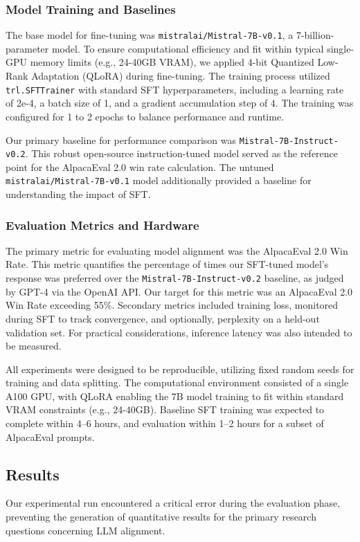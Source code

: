 \documentclass[11pt]{article}
\begin{document}
\subsubsection{Model Training and Baselines}
The base model for fine-tuning was \texttt{mistralai/Mistral-7B-v0.1}, a 7-billion-parameter model. To ensure computational efficiency and fit within typical single-GPU memory limits (e.g., 24-40GB VRAM), we applied 4-bit Quantized Low-Rank Adaptation (QLoRA) during fine-tuning. The training process utilized \texttt{trl.SFTTrainer} with standard SFT hyperparameters, including a learning rate of 2e-4, a batch size of 1, and a gradient accumulation step of 4. The training was configured for 1 to 2 epochs to balance performance and runtime.

Our primary baseline for performance comparison was \texttt{Mistral-7B-Instruct-v0.2}. This robust open-source instruction-tuned model served as the reference point for the AlpacaEval 2.0 win rate calculation. The untuned \texttt{mistralai/Mistral-7B-v0.1} model additionally provided a baseline for understanding the impact of SFT.

\subsubsection{Evaluation Metrics and Hardware}
The primary metric for evaluating model alignment was the AlpacaEval 2.0 Win Rate. This metric quantifies the percentage of times our SFT-tuned model's response was preferred over the \texttt{Mistral-7B-Instruct-v0.2} baseline, as judged by GPT-4 via the OpenAI API. Our target for this metric was an AlpacaEval 2.0 Win Rate exceeding 55\%. Secondary metrics included training loss, monitored during SFT to track convergence, and optionally, perplexity on a held-out validation set. For practical considerations, inference latency was also intended to be measured.

All experiments were designed to be reproducible, utilizing fixed random seeds for training and data splitting. The computational environment consisted of a single A100 GPU, with QLoRA enabling the 7B model training to fit within standard VRAM constraints (e.g., 24-40GB). Baseline SFT training was expected to complete within 4--6 hours, and evaluation within 1--2 hours for a subset of AlpacaEval prompts.

\subsection{Results}
Our experimental run encountered a critical error during the evaluation phase, preventing the generation of quantitative results for the primary research questions concerning LLM alignment.
\end{document}
